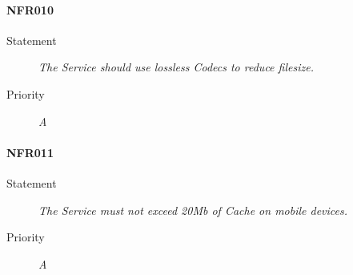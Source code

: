 \paragraph{NFR010}
\begin{description}
  \item [Statement]
    \textit{The Service should use lossless \gls{Codec}s to reduce filesize.}
  \item [Priority] \textit{A}
\end{description}

\paragraph{NFR011}
\begin{description}
  \item [Statement]
    \textit{The Service must not exceed 20Mb of \gls{Cache} on mobile devices.}
  \item [Priority] \textit{A}
\end{description}

